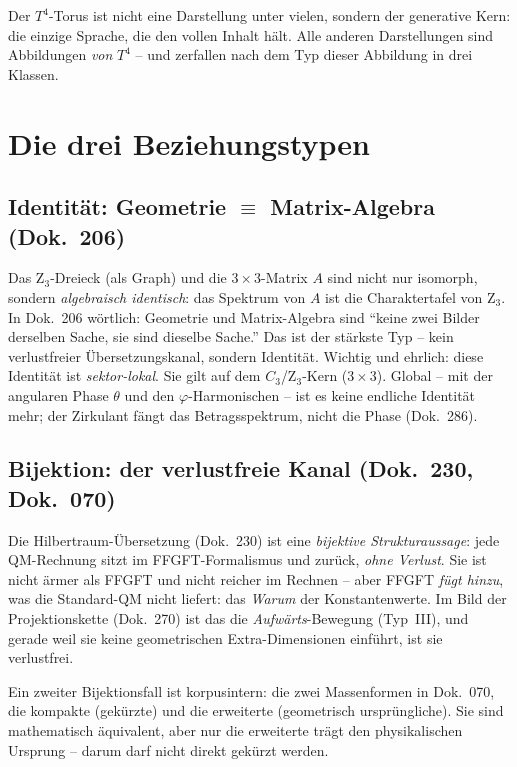 \begin{keyresult}
Der $T^4$-Torus ist nicht eine Darstellung unter vielen, sondern der generative Kern: die einzige
Sprache, die den vollen Inhalt hält. Alle anderen Darstellungen sind Abbildungen \emph{von} $T^4$
-- und zerfallen nach dem Typ dieser Abbildung in drei Klassen.
\end{keyresult}

\section{Die drei Beziehungstypen}

\subsection{Identität: Geometrie $\equiv$ Matrix-Algebra (Dok.~206)}
Das Z$_3$-Dreieck (als Graph) und die $3\times3$-Matrix $A$ sind nicht nur isomorph, sondern
\emph{algebraisch identisch}: das Spektrum von $A$ ist die Charaktertafel von Z$_3$. In Dok.~206
wörtlich: Geometrie und Matrix-Algebra sind \enquote{keine zwei Bilder derselben Sache, sie sind
dieselbe Sache.} Das ist der stärkste Typ -- kein verlustfreier Übersetzungskanal, sondern
Identität. Wichtig und ehrlich: diese Identität ist \emph{sektor-lokal}. Sie gilt auf dem
$C_3$/Z$_3$-Kern ($3\times3$). Global -- mit der angularen Phase $\theta$ und den $\varphi$-Harmonischen
-- ist es keine endliche Identität mehr; der Zirkulant fängt das Betragsspektrum, nicht die Phase
(Dok.~286).

\subsection{Bijektion: der verlustfreie Kanal (Dok.~230, Dok.~070)}
Die Hilbertraum-Übersetzung (Dok.~230) ist eine \emph{bijektive Strukturaussage}: jede
QM-Rechnung sitzt im FFGFT-Formalismus und zurück, \emph{ohne Verlust}. Sie ist nicht ärmer als
FFGFT und nicht reicher im Rechnen -- aber FFGFT \emph{fügt hinzu}, was die Standard-QM nicht
liefert: das \emph{Warum} der Konstantenwerte. Im Bild der Projektionskette (Dok.~270) ist das
die \emph{Aufwärts}-Bewegung (Typ~III), und gerade weil sie keine geometrischen Extra-Dimensionen
einführt, ist sie verlustfrei.

Ein zweiter Bijektionsfall ist korpusintern: die zwei Massenformen in Dok.~070, die kompakte
(gekürzte) und die erweiterte (geometrisch ursprüngliche). Sie sind mathematisch äquivalent, aber
nur die erweiterte trägt den physikalischen Ursprung -- darum darf nicht direkt gekürzt werden.

